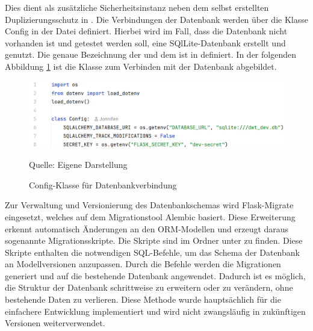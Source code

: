 Dies dient als zusätzliche Sicherheitsinstanz neben dem selbst erstellten Duplizierungsschutz in .
Die Verbindungen der Datenbank werden über die Klasse Config in der Datei  definiert.
Hierbei wird im Fall, dass die Datenbank nicht vorhanden ist und getestet werden soll, eine SQlLite-Datenbank erstellt und genutzt.
Die genaue Bezeichnung der  und dem  ist in  definiert.
In der folgenden Abbildung \ref{fig:Config-Klasse für Datenbankverbindung} ist die Klasse  zum Verbinden mit der Datenbank abgebildet.

\begin{figure}[H]
    \centering
    \includegraphics[width=1\textwidth]{Grafiken/Config.png}
    \caption{Config-Klasse für Datenbankverbindung}
    \label{fig:Config-Klasse für Datenbankverbindung}
    {Quelle: Eigene Darstellung}
\end{figure}

Zur Verwaltung und Versionierung des Datenbankschemas wird Flask-Migrate eingesetzt, welches auf dem Migrationstool Alembic basiert.
Diese Erweiterung erkennt automatisch Änderungen an den ORM-Modellen und erzeugt daraus sogenannte Migrationsskripte. Die Skripte sind im Ordner  unter  zu finden.
Diese Skripte enthalten die notwendigen SQL-Befehle, um das Schema der Datenbank an Modellversionen anzupassen.
Durch die Befehle werden die Migrationen generiert und auf die bestehende Datenbank angewendet.
Dadurch ist es möglich, die Struktur der Datenbank schrittweise zu erweitern oder zu verändern, ohne bestehende Daten zu verlieren.
Diese Methode wurde hauptsächlich für die einfachere Entwicklung implementiert und wird nicht zwangsläufig in zukünftigen Versionen weiterverwendet.






